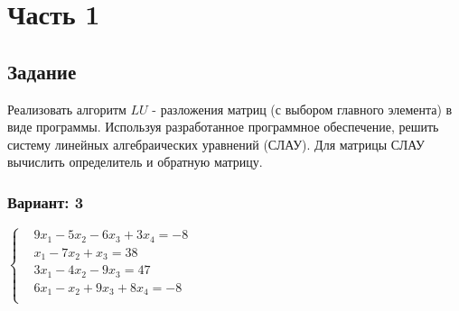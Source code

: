 
\chapter*{Часть 1}

\section*{Задание}
Реализовать алгоритм $LU$ - разложения матриц (с выбором главного элемента) в виде
программы. Используя разработанное программное обеспечение, решить систему линейных
алгебраических уравнений (СЛАУ). Для матрицы СЛАУ вычислить определитель и обратную
матрицу.

\subsection*{Вариант: 3}


$\left\{\begin{aligned}
    & 9x_1 - 5x_2 - 6x_3 + 3x_4 = -8 \\
    & x_1 - 7x_2 + x_3 = 38 \\
    & 3x_1 - 4x_2 - 9x_3 = 47 \\
    & 6x_1 - x_2 + 9x_3 + 8x_4 = -8 \\
\end{aligned}\right.$

\pagebreak